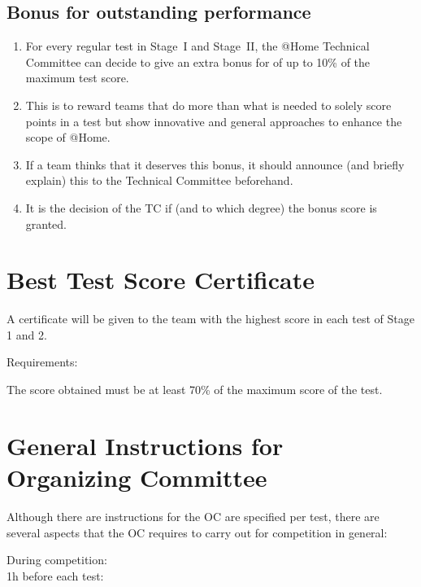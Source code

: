 \subsection{Bonus for outstanding performance}\label{rule:outstanding_performance}
\begin{enumerate}
\item For every regular test in Stage~I and Stage~II, the @Home Technical
Committee can decide to give an extra bonus for  
of up to 10\% of the maximum test score. 
\item This is to reward teams that do more than what is needed to solely score points in a
test but show innovative and general approaches to enhance the scope of @Home. 
\item If a team thinks that it deserves this bonus, it should announce (and briefly explain) 
this to the Technical Committee beforehand.
\item It is the decision of the TC if (and to which degree) the bonus score is granted.
\end{enumerate}


\section{Best Test Score Certificate}\label{sec:best_score_certificate}
A certificate will be given to the team with the highest score in each test of Stage 1 and 2. 

\begin{enumerate}
{\bf\item Requirements:} The score obtained must be at least 70\% of the maximum score of the test.
\end{enumerate}

\section{General Instructions for Organizing Committee}\label{sec:oc_general_instructions}
Although there are instructions for the OC are specified per test, there are several aspects that the OC requires to carry out for competition in general:
\begin{description}
\item[During competition:] \hfill
{}
\item[1h before each test:] \hfill
{}
\end{description}


